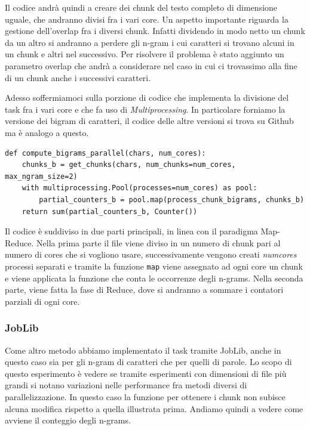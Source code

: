 \documentclass[10pt,twocolumn,letterpaper]{article}
\begin{document}
Il codice andrà quindi a creare dei chunk del testo completo di dimensione uguale, che andranno divisi fra i vari core. Un aspetto importante riguarda la gestione dell'overlap fra i diversi chunk. Infatti dividendo in modo netto un chunk da un altro si andranno a perdere gli n-gram i cui caratteri si trovano alcuni in un chunk e altri nel successivo. Per risolvere il problema è stato aggiunto un parametro overlap che andrà a considerare nel caso in cui ci trovassimo alla fine di un chunk anche i successivi caratteri.\par
Adesso soffermiamoci sulla porzione di codice che implementa la divisione del task fra i vari core e che fa uso di \textit{Multiprocessing}. In particolare forniamo la versione dei bigram di caratteri, il codice delle altre versioni si trova su Github ma è analogo a questo.

\begin{lstlisting}[caption={Calcolo degi n-grams con Multiprocessing.}]
def compute_bigrams_parallel(chars, num_cores):
    chunks_b = get_chunks(chars, num_chunks=num_cores, max_ngram_size=2)
    with multiprocessing.Pool(processes=num_cores) as pool:
        partial_counters_b = pool.map(process_chunk_bigrams, chunks_b)
    return sum(partial_counters_b, Counter())
\end{lstlisting}

Il codice è suddiviso in due parti principali, in linea con il paradigma Map-Reduce. Nella prima parte il file viene diviso in un numero di chunk pari al numero di cores che si vogliono usare, successivamente vengono creati \textit{numcores} processi separati e tramite la funzione \lstinline{map} viene assegnato ad ogni core un chunk e viene applicata la funzione che conta le occorrenze degli n-grams. Nella seconda parte, viene fatta la fase di Reduce, dove si andranno a sommare i contatori parziali di ogni core.

\subsubsection{JobLib}
Come altro metodo abbiamo implementato il task tramite JobLib, anche in questo caso sia per gli n-gram di caratteri che per quelli di parole. Lo scopo di questo esperimento è vedere se tramite esperimenti con dimensioni di file più grandi si notano variazioni nelle performance fra metodi diversi di parallelizzazione. In questo caso la funzione per ottenere i chunk non subisce alcuna modifica rispetto a quella illustrata prima. Andiamo quindi a vedere come avviene il conteggio degli n-grams.
\end{document}
